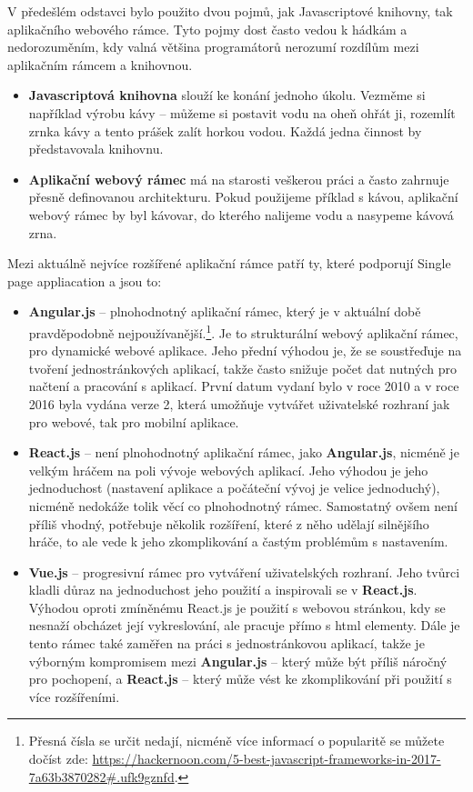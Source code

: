 \par V předešlém odstavci bylo použito dvou pojmů, jak Javascriptové knihovny, tak aplikačního webového rámce. Tyto pojmy dost často vedou k hádkám a nedorozuměním, kdy valná většina programátorů nerozumí rozdílům mezi aplikačním rámcem a knihovnou.
\begin{itemize}
\item \textbf{Javascriptová knihovna} slouží ke konání jednoho úkolu. Vezměme si například výrobu kávy -- můžeme si postavit vodu na oheň ohřát ji, rozemlít zrnka kávy a tento prášek zalít horkou vodou. Každá jedna činnost by představovala knihovnu.
\item \textbf{Aplikační webový rámec} má na starosti veškerou práci a často zahrnuje přesně definovanou architekturu. Pokud použijeme příklad s kávou, aplikační webový rámec by byl kávovar, do kterého nalijeme vodu a nasypeme kávová zrna. \cite{framework-vs-library}
\end{itemize}

\par Mezi aktuálně nejvíce rozšířené aplikační rámce patří ty, které podporují Single page appliacation a jsou to:
\begin{itemize}
\item \textbf{Angular.js} -- plnohodnotný aplikační rámec, který je v aktuální době pravděpodobně nejpoužívanější.\footnote{Přesná čísla se určit nedají, nicméně více informací o popularitě se můžete dočíst zde: \url{https://hackernoon.com/5-best-javascript-frameworks-in-2017-7a63b3870282\#.ufk9gznfd}.}. Je to strukturální webový aplikační rámec, pro dynamické webové aplikace. Jeho přední výhodou je, že se soustřeďuje na tvoření jednostránkových aplikací, takže často snižuje počet dat nutných pro načtení a pracování s aplikací. První datum vydaní bylo v roce 2010 a v roce 2016 byla vydána verze 2, která umožňuje vytvářet uživatelské rozhraní jak pro webové, tak pro mobilní aplikace.
\item \textbf{React.js} -- není plnohodnotný aplikační rámec, jako \textbf{Angular.js}, nicméně je velkým hráčem na poli vývoje webových aplikací. Jeho výhodou je jeho jednoduchost (nastavení aplikace a počáteční vývoj je velice jednoduchý), nicméně nedokáže tolik věcí co plnohodnotný rámec. Samostatný ovšem není příliš vhodný, potřebuje několik rozšíření, které z něho udělají silnějšího hráče, to ale vede k jeho zkomplikování  a častým problémům s nastavením.
\item \textbf{Vue.js} -- progresivní rámec pro vytváření uživatelských rozhraní. Jeho tvůrci kladli důraz na jednoduchost jeho použití a inspirovali se v \textbf{React.js}. Výhodou oproti zmíněnému React.js je použití s webovou stránkou, kdy se nesnaží obcházet její vykreslování, ale pracuje přímo s html elementy. Dále je tento rámec také zaměřen na práci s jednostránkovou aplikací, takže je výborným kompromisem mezi \textbf{Angular.js} -- který může být příliš náročný pro pochopení, a \textbf{React.js} -- který může vést ke zkomplikování při použití s více rozšířeními.
\end{itemize}

